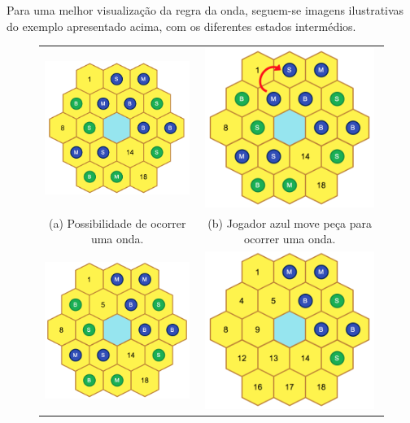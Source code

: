 \documentclass[a4paper]{article}
\begin{document}
Para uma melhor visualização da regra da onda, seguem-se imagens ilustrativas do exemplo apresentado acima, com os diferentes estados intermédios.

\begin{figure}
\begin{tabular}{cc}
  \includegraphics[width=55mm]{wave1.png} &   \includegraphics[width=55mm]{wave2.png} \\
(a) Possibilidade de ocorrer uma onda. & (b) Jogador azul move peça para  ocorrer uma onda. \\[6pt]
 \includegraphics[width=55mm]{wave3.png} &   \includegraphics[width=55mm]{wave4.png} \\

\end{tabular}
\end{figure}
\end{document}
